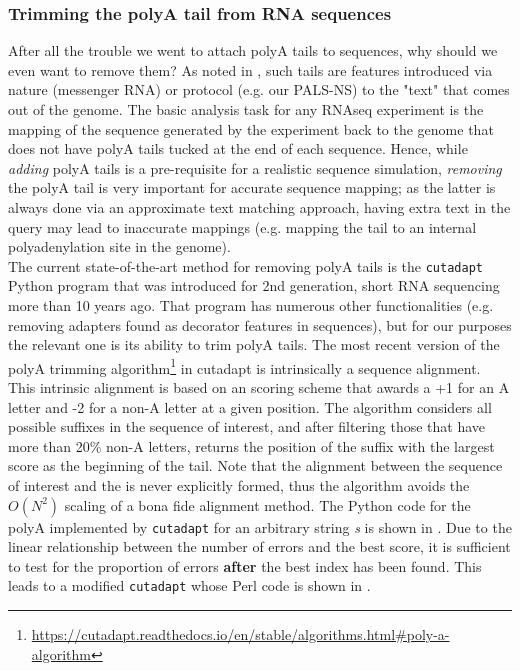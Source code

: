\documentclass[10pt]{article}
\begin{document}
\subsubsection{Trimming the polyA tail from RNA sequences }
After all the trouble we went to attach polyA tails to sequences, why should we even want to remove them? As noted in , such tails are features introduced via nature (messenger RNA) or protocol (e.g. our PALS-NS) to the "text" that comes out of the genome. The basic analysis task for any RNAseq experiment is the mapping of the sequence generated by the experiment back to the genome that does not have polyA tails tucked at the end of each sequence. Hence, while \textit{adding} polyA tails is a pre-requisite for a realistic sequence simulation, \textit{removing} the polyA tail is very important for accurate sequence mapping; as the latter is always done via an approximate text matching approach, having extra text in the query may lead to inaccurate mappings (e.g. mapping the tail to an internal polyadenylation site in the genome). 
\\
The current state-of-the-art method for removing polyA tails is the \texttt{cutadapt} Python program\cite{martin_cutadapt_2011} that was introduced for 2nd generation, short RNA sequencing more than 10 years ago. That program has numerous other functionalities (e.g. removing adapters found as decorator features in sequences), but for our purposes the relevant one  is its ability to trim polyA tails. The most recent version of the polyA trimming algorithm\footnote{\url{https://cutadapt.readthedocs.io/en/stable/algorithms.html\#poly-a-algorithm}} in cutadapt is intrinsically a sequence alignment. This intrinsic alignment is based on an  scoring scheme that awards a +1 for an A letter and  -2 for a non-A letter at a given position. The algorithm considers all possible suffixes in the sequence of interest, and after filtering those that have more than 20\% non-A letters, returns the position of the suffix with the largest score as the beginning of the tail. Note that the alignment between the sequence of interest and the is never explicitly formed, thus the algorithm avoids the $O(N^2)$ scaling of a bona fide alignment method. 
The Python code for the polyA implemented by \texttt{cutadapt}  for an arbitrary string \textit{s} is shown in . Due to the linear relationship between the number of errors and the best score, it is sufficient to test for the proportion of errors \textbf{after} the best index has been found. This leads to a modified \texttt{cutadapt} whose Perl code is shown in .
\end{document}

